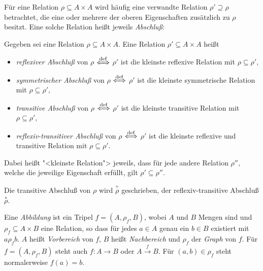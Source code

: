 Für eine Relation $\rho \subseteq A\times A$ wird häufig eine
verwandte Relation $\rho' \supseteq \rho$ betrachtet, die eine oder
mehrere der oberen Eigenschaften zusätzlich zu $\rho$ besitzt.  Eine
solche Relation heißt jeweils \textit{Abschluß}:
%
\begin{definition}
  \label{def:relation-closure}
  Gegeben sei eine Relation $\rho \subseteq A\times A$.  Eine Relation
  $\rho' \subseteq A\times A$ heißt
  \begin{itemize}
  \item \textit{reflexiver Abschluß} von $\rho$ $\stackrel{\rm def}{\Longleftrightarrow}$ $\rho'$ ist
    die kleinste reflexive Relation mit $\rho\subseteq\rho'$,
  \item \textit{symmetrischer Abschluß} von $\rho$ $\stackrel{\rm def}{\Longleftrightarrow}$ $\rho'$ ist
    die kleinste symmetrische Relation mit $\rho\subseteq\rho'$,
  \item \textit{transitive Abschluß} von $\rho$ $\stackrel{\rm def}{\Longleftrightarrow}$ $\rho'$ ist
    die kleinste transitive Relation mit $\rho\subseteq\rho'$,
  \item \textit{reflexiv-transitiver Abschluß} von $\rho$ $\stackrel{\rm def}{\Longleftrightarrow}$
    $\rho'$ ist die kleinste reflexive und transitive Relation mit
    $\rho\subseteq\rho'$.
  \end{itemize}
  Dabei heißt "<kleinste Relation"> jeweils, dass für jede andere
  Relation $\rho''$, welche die jeweilige Eigenschaft erfüllt, gilt
  $\rho' \subseteq \rho''$.
  
  Die transitive Abschluß von $\rho$ wird $\overset{+}{\rho}$
  geschrieben, der reflexiv-transitive Abschluß
  $\overset{\ast}{\rho}$.
\end{definition}


\begin{definition}\label{abbildung} Eine \emph{Abbildung} 
ist ein Tripel $f = (A,\rho_f,B)$, wobei
   $A$ und $B$ Mengen sind und $\rho_f\subseteq A \times B$ eine Relation, so
   dass für jedes $a\in A$ genau ein $b\in B$ existiert mit $a\rho_f b$. 
   $A$ heißt \emph{Vorbereich} von $f$, $B$ heißt \emph{Nachbereich} und
   $\rho_f$ der \emph{Graph} von $f$.
   Für
   $f=(A,\rho_f,B)$ steht auch $f:A\rightarrow B$ oder 
   $A\stackrel{f}{\longrightarrow}B$. Für $(a,b) \in \rho_f$ steht
   normalerweise $f(a) = b$. %
\end{definition}

